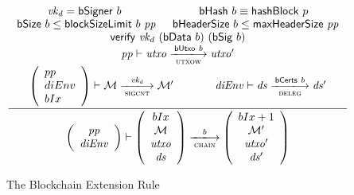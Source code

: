 \documentclass[11pt,a4paper]{article}
\newcommand{\var}[1]{\mathit{#1}}
\newcommand{\fun}[1]{\mathsf{#1}}
\newcommand{\trans}[2]{\xlongrightarrow[\textsc{#1}]{#2}}
\newcommand{\hashname}{bHash}
\newcommand{\bsizename}{bSize}
\newcommand{\bhdrsizename}{bHeaderSize}
\newcommand{\verifyname}{verify}
\newcommand{\signmapname}{\mathcal{M}}
\newcommand{\hashofblockname}{hashBlock}
\newcommand{\blocksizelimitname}{blockSizeLimit}
\newcommand{\maxheadersizename}{maxHeaderSize}
\newcommand{\bdataname}{bData}
\newcommand{\bcertsname}{bCerts}
\newcommand{\bsigname}{bSig}
\newcommand{\bsignername}{bSigner}
\newcommand{\verify}[3]{\fun{\verifyname} ~ #1 ~ #2 ~ #3}
\newcommand{\hash}[1]{\fun{\hashname}\ #1}
\newcommand{\bsize}[1]{\fun{\bsizename} ~ #1}
\newcommand{\bhdrsize}[1]{\fun{\bhdrsizename} ~ #1}
\newcommand{\hashofblock}[1]{\fun{\hashofblockname} ~ #1}
\newcommand{\blocksizelimit}[2]{\fun{\blocksizelimitname} ~ #1 ~ #2}
\newcommand{\maxheadersize}[1]{\fun{\maxheadersizename} ~ #1}
\newcommand{\bdata}[1]{\fun{\bdataname} ~ #1}
\newcommand{\bcerts}[1]{\fun{\bcertsname} ~ #1}
\newcommand{\bsig}[1]{\fun{\bsigname} ~ #1}
\newcommand{\bsigner}[1]{\fun{\bsignername} ~ #1}
\begin{document}
\begin{figure}
  \begin{equation*}
  \inference
  {
    \var{vk_d} = \bsigner{b} & \hash{b} \equiv \hashofblock{p} \\
    \bsize{b} \leq \blocksizelimit{b}{\var{pp}} & \bhdrsize{b} \leq \maxheadersize{\var{pp}} \\
    \verify{\var{vk_d}}{(\bdata{b})}{(\bsig{b})} \\
    \var{pp} \vdash \var{utxo} \trans{utxow}{\butxo{b}} \var{utxo'} \\
    {\left(
      \begin{array}{l}
        pp \\
        diEnv \\
        bIx
      \end{array}
    \right)}
    \vdash
    \signmapname \trans{sigcnt}{\var{vk_d}} \signmapname' &&
    \var{diEnv} \vdash \var{ds} \trans{deleg}{\bcerts{b}} \var{ds'}
  }
  {
    \left(
      {\begin{array}{c}
         \var{pp} \\
         \var{diEnv}
       \end{array}}
    \right)
    \vdash
    \left(
      {\begin{array}{c}
         bIx \\
         \signmapname \\
         \var{utxo} \\
         \var{ds}
       \end{array}}
    \right)
    \trans{chain}{b}
    \left(
      {\begin{array}{c}
         bIx + 1 \\
         \signmapname' \\
         \var{utxo}' \\
         \var{ds'}
       \end{array}}
    \right)
 }
  \end{equation*}
  \caption{The Blockchain Extension Rule}
  \label{fig:blockchain-extension}
\end{figure}
\clearpage


\end{document}

